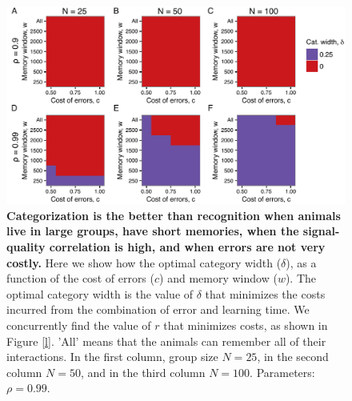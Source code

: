 \begin{figure}
\includegraphics[width=6.85in]{figures/strategies_heat_maps.pdf}
\caption{\sffamily\small\textbf{Categorization is the better than recognition when animals live in large groups, have short memories, when the signal-quality correlation is high, and when errors are not very costly.} Here we show how the optimal category width ($\delta$), as a function of the cost of errors ($c$) and memory window ($w$). The optimal category width is the value of $\delta$ that minimizes the costs incurred from the combination of error and learning time. We concurrently find the value of $r$ that minimizes costs, as shown in Figure \ref{l}. 'All' means that the animals can remember all of their interactions. In the first column, group size $N=25$, in the second column $N=50$, and in the third column $N=100$. Parameters: $\rho=0.99$. }
\label{opt_delta}
\end{figure}


